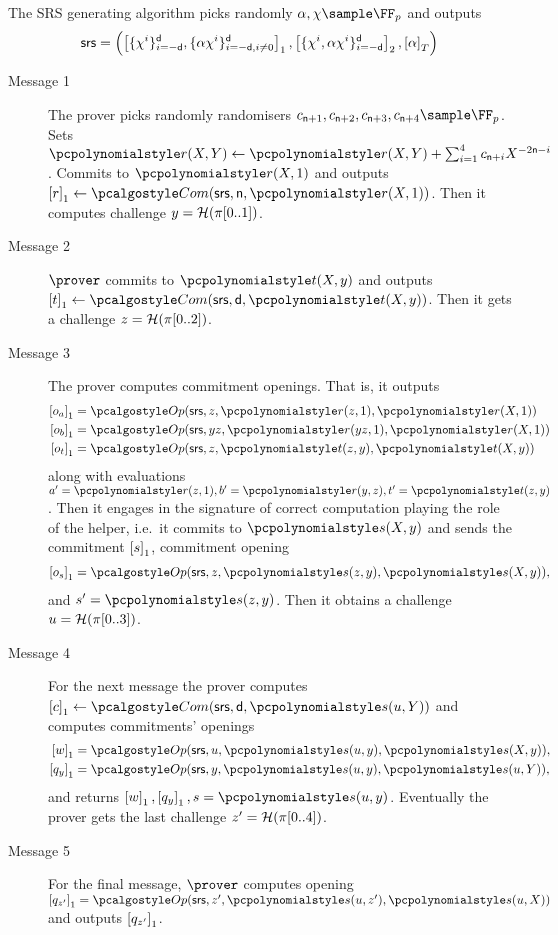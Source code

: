  The SRS generating algorithm picks
randomly $\alpha, \chi \sample \FF_p$ and outputs
	\[
      \mathsf{srs} = \left( \left[\{\chi^i\}_{i = -\mathsf{d}}^{\mathsf{d}},
          \{\alpha \chi^i\}_{i = -\mathsf{d}, i \neq 0}^{\mathsf{d}}\right]_{1},
        \left[\{\chi^i, \alpha \chi^i\}_{i = - \mathsf{d}}^{\mathsf{d}}\right]_{2},
        \left[\alpha\right]_{T} \right)
	\]
\begin{description}
\item[Message 1] The prover picks randomly randomisers
  $c_{\multconstr + 1}, c_{\multconstr + 2}, c_{\multconstr + 3}, c_{\multconstr
    + 4} \sample \FF_p$. Sets
  $\pr(X, Y) \gets \pr(X, Y) + \sum_{i = 1}^4 c_{\multconstr + i} X^{- 2
    \multconstr - i}$. Commits to $\pr(X, 1)$ and outputs
  $\gone{r} \gets \com(\srs, \multconstr, \pr(X, 1))$.  Then it computes challenge $y = \mathcal{H}(\pi[0..1])$.
\item[Message 2] $\prover$ commits to $\pt(X, y)$ and outputs
  $\gone{t} \gets \com(\srs, \dconst, \pt(X, y))$. Then it gets a challenge $z = \mathcal{H}(\pi[0..2])$.
\item[Message 3] The prover computes commitment openings. That is, it outputs
  \begin{align*}
    \gone{o_a} & = \open(\srs, z, \pr(z, 1), \pr(X, 1)) \\
    \gone{o_b} & = \open(\srs, yz, \pr(yz, 1), \pr(X, 1)) \\
    \gone{o_t} & = \open(\srs, z, \pt(z, y), \pt(X, y)) 
  \end{align*}
  along with evaluations $a' = \pr(z, 1), b' = \pr(y, z), t' = \pt(z, y)$.  Then it
  engages in the signature of correct computation playing the role of the
  helper, i.e.~it commits to $\p{s}(X, y)$ and sends the commitment $\left[s\right]_{1}$, commitment opening
  \begin{align*}
    \gone{o_s} & = \open(\srs, z, \p{s}(z, y), \p{s}(X, y)), \\
  \end{align*} and $s'=\p{s}(z, y)$. 
%
  Then
  it obtains a challenge $u = \mathcal{H}(\pi[0..3])$.
\item[Message 4] For the next message the prover computes
  $\gone{c} \gets \com(\srs, \dconst, \p{s}(u, Y))$ and
  computes commitments' openings
  \begin{align*}
    \gone{w} & = \open(\srs, u, \p{s}(u, y), \p{s}(X, y)), \\
    \gone{q_y} & = \open(\srs, y,\p{s}(u, y), \p{s}(u, Y)),
  \end{align*}
  and returns $\gone{w}, \gone{q_y}, s = \p{s}(u, y)$. Eventually the prover gets the last challenge
  $z' = \mathcal{H}(\pi[0..4])$.
\item[Message 5] For the final message, $\prover$ computes opening
  $\gone{q_{z'}} = \open(\srs, z', \p{s}(u, z'), \p{s}(u, X))$ and outputs $\left[q_{z'}\right]_{1}$.
\end{description}

